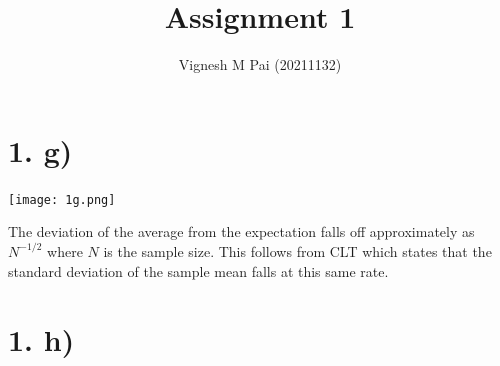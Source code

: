 \documentclass{article}
\title{Assignment 1}
\author{Vignesh M Pai (20211132)}
\begin{document}
\maketitle

\section*{1. g)}

\begin{center}
    \texttt{[image: 1g.png]}    
\end{center}

The deviation of the average from the expectation falls off approximately as $N^{-1/2}$ where $N$ is the sample size.
This follows from CLT which states that the standard deviation of the sample mean falls at this same rate.

\section*{1. h)}
\end{document}
